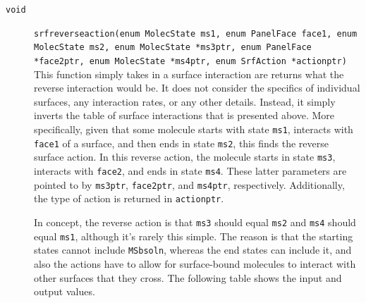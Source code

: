 \documentclass {scrbook}
\newcommand {\ttt} {\texttt}
\begin{document}
\begin{description}
\item[\ttt{void}]
\ttt{srfreverseaction(enum MolecState ms1, enum PanelFace face1, enum MolecState ms2, enum MolecState *ms3ptr, enum PanelFace *face2ptr, enum MolecState *ms4ptr, enum SrfAction *actionptr)}
\hfill \\
This function simply takes in a surface interaction are returns what the reverse interaction would be. It does not consider the specifics of individual surfaces, any interaction rates, or any other details. Instead, it simply inverts the table of surface interactions that is presented above. More specifically, given that some molecule starts with state \ttt{ms1}, interacts with \ttt{face1} of a surface, and then ends in state \ttt{ms2}, this finds the reverse surface action. In this reverse action, the molecule starts in state \ttt{ms3}, interacts with \ttt{face2}, and ends in state \ttt{ms4}. These latter parameters are pointed to by \ttt{ms3ptr}, \ttt{face2ptr}, and \ttt{ms4ptr}, respectively. Additionally, the type of action is returned in \ttt{actionptr}.

In concept, the reverse action is that \ttt{ms3} should equal \ttt{ms2} and \ttt{ms4} should equal \ttt{ms1}, although it's rarely this simple. The reason is that the starting states cannot include \ttt{MSbsoln}, whereas the end states can include it, and also the actions have to allow for surface-bound molecules to interact with other surfaces that they cross. The following table shows the input and output values.


\end{description}
\end{document}
